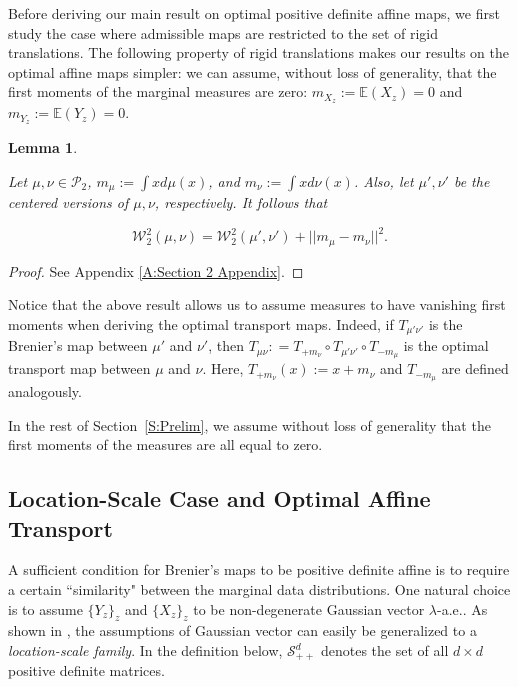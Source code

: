\documentclass[twoside,11pt]{article}
\newtheorem{lem}{Lemma}[section]{\bfseries}{\itshape}
\begin{document}
Before deriving our main result on optimal positive definite affine maps, we first study the case where admissible maps are restricted to the set of rigid translations. The following property of rigid translations makes our results on the optimal affine maps simpler: we can assume, without loss of generality, that the first moments of the marginal measures are zero: $m_{X_z} := \mathbb{E}(X_z) = 0$ and $m_{Y_z} := \mathbb{E}(Y_z) = 0$.

\begin{lem} \label{l:Rigid translation property}

Let $\mu, \nu \in \mathcal{P}_2$, $m_{\mu} := \int x d\mu(x)$, and $m_{\nu} := \int x d\nu(x)$. Also, let $\mu', \nu'$ be the centered versions of $\mu,\nu$, respectively. It follows that 

\begin{equation}
\mathcal{W}_2^2(\mu,\nu) = \mathcal{W}_2^2(\mu',\nu') + ||m_{\mu} - m_{\nu}||^2.
\end{equation}

\end{lem}

\begin{proof}
See Appendix \ref{A:Section 2 Appendix}.
\end{proof}

Notice that the above result allows us to assume measures to have vanishing first moments when deriving the optimal transport maps. Indeed, if $T_{\mu' \nu'}$ is the Brenier's map between $\mu'$ and $\nu'$, then $T_{\mu \nu} : =  T_{+m_{\nu}} \circ T_{\mu' \nu'} \circ T_{-m_{\mu}}$ is the optimal transport map between $\mu$ and $\nu$. Here, $T_{+m_{\nu}}(x) := x + m_{\nu}$ and $T_{-m_{\mu}}$ are defined analogously.

In the rest of Section~\ref{S:Prelim}, we assume without loss of generality that the first moments of the measures are all equal to zero.

\subsection{Location-Scale Case and Optimal Affine Transport}

A sufficient condition for Brenier's maps to be positive definite affine is to require a certain ``similarity" between the marginal data distributions. One natural choice is to assume $\{Y_z\}_z$ and $\{X_z\}_z$ to be non-degenerate Gaussian vector $\lambda$-a.e.. As shown in \cite{alvarez2016fixed}, the assumptions of Gaussian vector can easily be generalized to a {\em location-scale family}. In the definition below, $\mathcal{S}^d_{++}$ denotes the set of all $d \times d$ positive definite matrices.
\end{document}
